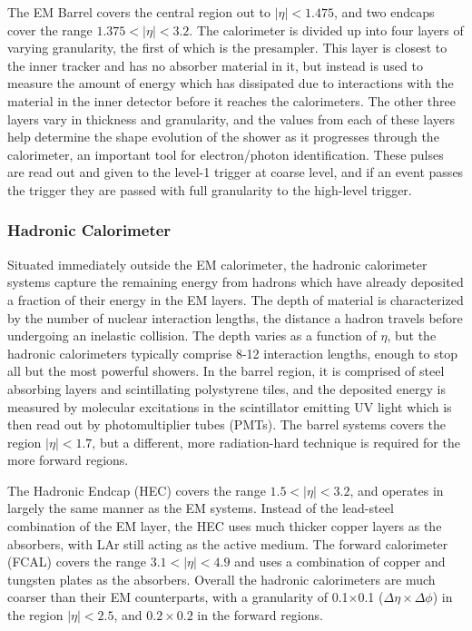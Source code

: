 The EM Barrel covers the central region out to $|\eta|<1.475$, and two endcaps cover the range $1.375<|\eta|<3.2$.  The calorimeter is divided up into four layers of varying granularity, the first of which is the presampler.  This layer is closest to the inner tracker and has no absorber material in it, but instead is used to measure the amount of energy which has dissipated due to interactions with the material in the inner detector before it reaches the calorimeters.  The other three layers vary in thickness and granularity, and the values from each of these layers help determine the shape evolution of the shower as it progresses through the calorimeter, an important tool for electron/photon identification.  These pulses are read out and given to the level-1 trigger at coarse level, and if an event passes the trigger they are passed with full granularity to the high-level trigger.

\subsubsection{Hadronic Calorimeter}

Situated immediately outside the EM calorimeter, the hadronic calorimeter systems capture the remaining energy from hadrons which have already deposited a fraction of their energy in the EM layers.  The depth of material is characterized by the number of nuclear interaction lengths, the distance a hadron travels before undergoing an inelastic collision.  The depth varies as a function of $\eta$, but the hadronic calorimeters typically comprise 8-12 interaction lengths, enough to stop all but the most powerful showers.  In the barrel region, it is comprised of steel absorbing layers and scintillating polystyrene tiles, and the deposited energy is measured by molecular excitations in the scintillator emitting UV light which is then read out by photomultiplier tubes (PMTs).  The barrel systems covers the region $|\eta|<1.7$, but a different, more radiation-hard technique is required for the more forward regions.

The Hadronic Endcap (HEC) covers the range $1.5<|\eta|<3.2$, and operates in largely the same manner as the EM systems.  Instead of the lead-steel combination of the EM layer, the HEC uses much thicker copper layers as the absorbers, with LAr still acting as the active medium.  The forward calorimeter (FCAL) covers the range $3.1<|\eta|<4.9$ and uses a combination of copper and tungsten plates as the absorbers.  Overall the hadronic calorimeters are much coarser than their EM counterparts, with a granularity of 0.1$\times$0.1 ($\Delta\eta\times\Delta\phi$) in the region $|\eta|<2.5$, and $0.2\times0.2$ in the forward regions.  

